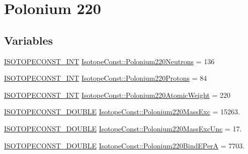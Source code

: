 \hypertarget{group___isotope_const-_polonium-_po220}{}\section{Polonium 220}
\label{group___isotope_const-_polonium-_po220}
\subsection*{Variables}
\begin{DoxyCompactItemize}
\item 
\mbox{\hyperlink{group___isotope_const-_macros_ga5f18360b3e99483a35c32d789e62621c}{I\+S\+O\+T\+O\+P\+E\+C\+O\+N\+S\+T\+\_\+\+I\+NT}} \mbox{\hyperlink{group___isotope_const-_polonium-_po220_ga46f44e92683d356a4b3330a18994a6d1}{Isotope\+Const\+::\+Polonium220\+Neutrons}} = 136
\item 
\mbox{\hyperlink{group___isotope_const-_macros_ga5f18360b3e99483a35c32d789e62621c}{I\+S\+O\+T\+O\+P\+E\+C\+O\+N\+S\+T\+\_\+\+I\+NT}} \mbox{\hyperlink{group___isotope_const-_polonium-_po220_ga7ac352d9704b8e505b5b5735f5b1e96a}{Isotope\+Const\+::\+Polonium220\+Protons}} = 84
\item 
\mbox{\hyperlink{group___isotope_const-_macros_ga5f18360b3e99483a35c32d789e62621c}{I\+S\+O\+T\+O\+P\+E\+C\+O\+N\+S\+T\+\_\+\+I\+NT}} \mbox{\hyperlink{group___isotope_const-_polonium-_po220_gae7c39a3a77e0950ca59df7ea563eb1ed}{Isotope\+Const\+::\+Polonium220\+Atomic\+Weight}} = 220
\item 
\mbox{\hyperlink{group___isotope_const-_macros_ga8f45a7272ce02c0b4c65c44636ed719a}{I\+S\+O\+T\+O\+P\+E\+C\+O\+N\+S\+T\+\_\+\+D\+O\+U\+B\+LE}} \mbox{\hyperlink{group___isotope_const-_polonium-_po220_gacac60198ab0485112fd8f67bfff166ca}{Isotope\+Const\+::\+Polonium220\+Mass\+Exc}} = 15263.
\item 
\mbox{\hyperlink{group___isotope_const-_macros_ga8f45a7272ce02c0b4c65c44636ed719a}{I\+S\+O\+T\+O\+P\+E\+C\+O\+N\+S\+T\+\_\+\+D\+O\+U\+B\+LE}} \mbox{\hyperlink{group___isotope_const-_polonium-_po220_ga11499687a660815f87d947ce8569d3f1}{Isotope\+Const\+::\+Polonium220\+Mass\+Exc\+Unc}} = 17.
\item 
\mbox{\hyperlink{group___isotope_const-_macros_ga8f45a7272ce02c0b4c65c44636ed719a}{I\+S\+O\+T\+O\+P\+E\+C\+O\+N\+S\+T\+\_\+\+D\+O\+U\+B\+LE}} \mbox{\hyperlink{group___isotope_const-_polonium-_po220_ga4574b6d94790ccbd4778e1a7557afe02}{Isotope\+Const\+::\+Polonium220\+Bind\+E\+PerA}} = 7703.
\item 

\end{DoxyCompactItemize}
